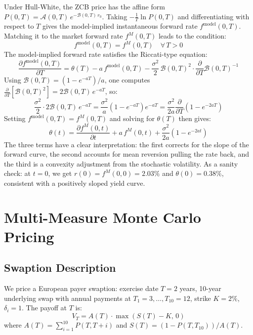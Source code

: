 \documentclass[12pt, a4paper]{article}
\begin{document}
Under Hull-White, the ZCB price has the affine form $P(0,T) = \mathcal{A}(0,T)\,e^{-\mathcal{B}(0,T)\,r_0}$. Taking $-\frac{1}{T}\ln P(0,T)$ and differentiating with respect to $T$ gives the model-implied instantaneous forward rate $f^{\text{model}}(0,T)$. Matching it to the market forward rate $f^M(0,T)$ leads to the condition:
\begin{equation}
f^{\text{model}}(0,T) = f^M(0,T) \quad \forall\, T > 0
\end{equation}
The model-implied forward rate satisfies the Riccati-type equation:
\begin{equation}
\frac{\partial f^{\text{model}}(0,T)}{\partial T} = \theta(T) - a\,f^{\text{model}}(0,T) - \frac{\sigma^2}{2}\,\mathcal{B}(0,T)^2 \cdot \frac{\partial}{\partial T}\mathcal{B}(0,T)^{-1}
\end{equation}
Using $\mathcal{B}(0,T) = (1-e^{-aT})/a$, one computes $\frac{\partial}{\partial T}[\mathcal{B}(0,T)^2] = 2\mathcal{B}(0,T)\,e^{-aT}$, so:
\begin{equation}
\frac{\sigma^2}{2} \cdot 2\mathcal{B}(0,T)\,e^{-aT} = \frac{\sigma^2}{a}\left(1 - e^{-aT}\right)e^{-aT} = \frac{\sigma^2}{2a}\frac{\partial}{\partial T}\!\left(1-e^{-2aT}\right)
\end{equation}
Setting $f^{\text{model}}(0,T) = f^M(0,T)$ and solving for $\theta(T)$ then gives:
\begin{equation}
\boxed{\theta(t) = \frac{\partial f^M(0,t)}{\partial t} + a\, f^M(0,t) + \frac{\sigma^2}{2a}\left(1 - e^{-2at}\right)}
\end{equation}
The three terms have a clear interpretation: the first corrects for the slope of the forward curve, the second accounts for mean reversion pulling the rate back, and the third is a convexity adjustment from the stochastic volatility. As a sanity check: at $t=0$, we get $r(0) = f^M(0,0) = 2.03\%$ and $\theta(0) = 0.38\%$, consistent with a positively sloped yield curve.

\section{Multi-Measure Monte Carlo Pricing}

\subsection{Swaption Description}

We price a European payer swaption: exercise date $T = 2$ years, 10-year underlying swap with annual payments at $T_1 = 3, \ldots, T_{10} = 12$, strike $K = 2\%$, $\delta_i = 1$. The payoff at $T$ is:
\begin{equation}
V_T = A(T) \cdot \max\!\left(S(T) - K,\, 0\right)
\end{equation}
where $A(T) = \sum_{i=1}^{10} P(T, T+i)$ and $S(T) = (1 - P(T, T_{10})) / A(T)$.
\end{document}
